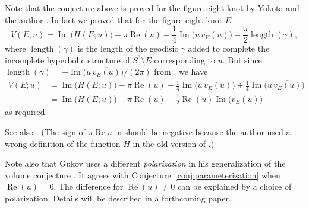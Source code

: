 \documentclass[a4paper]{amsart}
\theoremstyle{plain}
\theoremstyle{definition}
\theoremstyle{remark}
\renewcommand{\Re}{\operatorname{Re}}
\renewcommand{\Im}{\operatorname{Im}}
\numberwithin{equation}{section}
\begin{document}
\par
Note that the conjecture above is proved for the figure-eight knot by Yokota and the author \cite{Murakami/Yokota:JREIA}.
In fact we proved \cite[Corollary 2.4]{Murakami/Yokota:JREIA}
that for the figure-eight knot $E$
\begin{equation*}
  V(E;u)
  =
  \Im\bigl(H(E;u)\bigr)-\pi\Re(u)-\frac{1}{4}\Im\bigl(u\,v_E(u)\bigr)
  -\frac{\pi}{2}\operatorname{length}(\gamma),
\end{equation*}
where $\operatorname{length}(\gamma)$ is the length of the geodisic $\gamma$ added to complete the incomplete hyperbolic structure of $S^3\setminus{E}$ corresponding to $u$.
But since
$\operatorname{length}(\gamma)=-\Im\bigl(u\,\overline{v_E(u)}\bigr)/(2\pi)$
from \cite[(34)]{Neumann/Zagier:TOPOL85}, we have
\begin{equation*}
\begin{split}
  V(E;u)
  &=
  \Im\bigl(H(E;u)\bigr)-\pi\Re(u)-\frac{1}{4}\Im\bigl(u\,v_E(u)\bigr)
  +\frac{1}{4}\Im\bigl(u\,\overline{v_E(u)}\bigr)
  \\
  &=
  \Im\bigl(H(E;u)\bigr)-\pi\Re(u)-\frac{1}{2}\Re(u)\Im\bigl(v_E(u)\bigr)
\end{split}
\end{equation*}
as required.
\par
See also \cite[(4.1)]{Murakami:FUNDM2004}.
(The sign of $\pi\Re{u}$ in \cite[(4.1)]{Murakami:FUNDM2004} should be negative because the author used a wrong definition of the function $H$ in the old version of \cite{Murakami/Yokota:JREIA}.)
\par
Note also that Gukov uses a different {\em polarization}
in his generalization of the volume conjecture \cite[(5.12)]{Gukov:COMMP2005}.
It agrees with Conjecture~\ref{conj:parameterization} when $\Re(u)=0$.
The difference for $\Re(u)\ne0$ can be explained by a choice of polarization.
Details will be described in a forthcoming paper.
\end{document}
